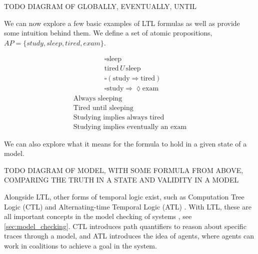 \par
TODO DIAGRAM OF GLOBALLY, EVENTUALLY, UNTIL
\par
We can now explore a few basic examples of LTL formulas as well as provide some intuition behind them. We define a set of atomic propositions, $AP = \{study, sleep, tired, exam\}$.
\begin{multicols}{2}
    \[
    \begin{aligned}
    &\square \text{sleep} \\
    &\text{tired} \, U \, \text{sleep} \\
    &\square (\text{study} \Rightarrow \text{tired}) \\
    &\square \text{study} \Rightarrow \lozenge \text{exam}
    \end{aligned}
    \]
    \vline
    \[
    \begin{aligned}
    \text{Always sleeping} \\
    \text{Tired until sleeping} \\
    \text{Studying implies always tired} \\
    \text{Studying implies eventually an exam}
    \end{aligned}
    \]
    \end{multicols}
\par
We can also explore what it means for the formula to hold in a given state of a model.
\par
TODO DIAGRAM OF MODEL, WITH SOME FORMULA FROM ABOVE, COMPARING THE TRUTH IN A STATE AND VALIDITY IN A MODEL
\par
Alongside LTL, other forms of temporal logic exist, such as Computation Tree Logic (CTL) \cite{temporal_and_modal_logic} and Alternating-time Temporal Logic (ATL) \cite{atl}. With LTL, these are all important concepts in the model checking of systems \cite{principles_of_model_checking}, see \ref{sec:model_checking}. CTL introduces path quantifiers to reason about specific traces through a model, and ATL introduces the idea of agents, where agents can work in coalitions to achieve a goal in the system.

